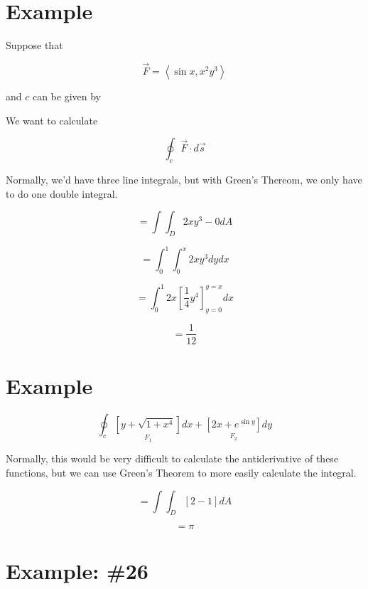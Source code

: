 \documentclass{article}
\begin{document}
\section*{Example}

Suppose that

\[
\vec{F} = \left<\sin{x}, x^2 y^3\right>
\]

and $c$ can be given by


We want to calculate

\[
\oint_c \vec{F}\cdot d\vec{s}
\]

Normally, we'd have three line integrals, but with Green's Thereom, we only have to do one double integral.

\[
=\int \int_D 2 x y^3 - 0 dA
\]

\[
=\int_0^1 \int_0^x 2 x y^3 dy dx
\]

\[
=\int_0^1 2 x \left[\frac{1}{4} y^4 \right]_{y=0}^{y=x} dx
\]

\[
=\frac{1}{12}
\]

\hrulefill

\section*{Example}

\[
\oint_c \underset{F_1}{\left[y+\sqrt{1+x^4}\right]} dx + \underset{F_2}{\left[2x+e^{\sin y}\right]} dy
\]

Normally, this would be very difficult to calculate the antiderivative of these functions, but we can use Green's Theorem to more easily calculate the integral.

\[
=\int \int_D \left[2 - 1\right] dA
\]

\[
=\pi
\]

\hrulefill

\section*{Example: \#26}
\end{document}
